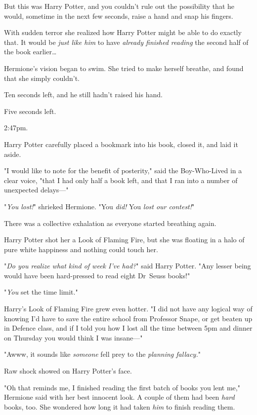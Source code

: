 But this was Harry Potter, and you couldn't rule out the possibility that he
would, sometime in the next few seconds, raise a hand and snap his fingers.

With sudden terror she realized how Harry Potter might be able to do exactly
that. It would be \emph{just like him} to have \emph{already finished reading}
the second half of the book earlier{\ldots}

Hermione's vision began to swim. She tried to make herself breathe, and found
that she simply couldn't.

Ten seconds left, and he still hadn't raised his hand.

Five seconds left.

2:47pm.

Harry Potter carefully placed a bookmark into his book, closed it, and laid it
aside.

"I would like to note for the benefit of posterity," said the Boy-Who-Lived in
a clear voice, "that I had only half a book left, and that I ran into a number
of unexpected delays---"

"\emph{You lost!}" shrieked Hermione. "You \emph{did!} You \emph{lost our
contest!}"

There was a collective exhalation as everyone started breathing again.

Harry Potter shot her a Look of Flaming Fire, but she was floating in a halo of
pure white happiness and nothing could touch her.

"\emph{Do you realize what kind of week I've had?}" said Harry Potter. "Any
lesser being would have been hard-pressed to read eight Dr~Seuss books!"

"\emph{You} set the time limit."

Harry's Look of Flaming Fire grew even hotter. "I did not have any logical way
of knowing I'd have to save the entire school from Professor Snape, or get
beaten up in Defence class, and if I told you how I lost all the time between
5pm and dinner on Thursday you would think I was insane---"

"Awww, it sounds like \emph{someone} fell prey to the \emph{planning fallacy.}"

Raw shock showed on Harry Potter's face.

"Oh that reminds me, I finished reading the first batch of books you lent me,"
Hermione said with her best innocent look. A couple of them had been
\emph{hard} books, too. She wondered how long it had taken \emph{him} to finish
reading them.

